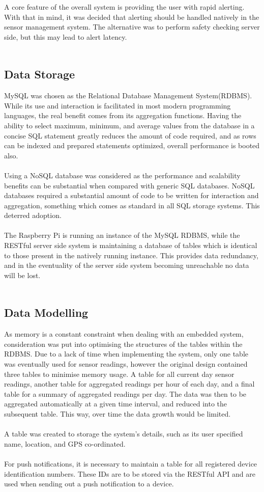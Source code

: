 \documentclass{article}
\begin{document}
A core feature of the overall system is providing the user with rapid alerting. With that in mind, it was decided that alerting should be handled natively in the sensor management system. The alternative was to perform safety checking server side, but this may lead to alert latency. \\\

\subsection{Data Storage}
MySQL was chosen as the Relational Database Management System(RDBMS). While its use and interaction is facilitated in most modern programming languages, the real benefit comes from its aggregation functions. Having the ability to select maximum, minimum, and average values from the database in a concise SQL statement greatly reduces the amount of code required, and as rows can be indexed and prepared statements optimized, overall performance is booted also. \\\\
Using a NoSQL database was considered as the performance and scalability benefits can be substantial when compared with generic SQL databases. NoSQL databases required a substantial amount of code to be written for interaction and aggregation, something which comes as standard in all SQL storage systems. This deterred adoption. \\\\
The Raspberry Pi is running an instance of the MySQL RDBMS, while the RESTful server side system is maintaining a database of tables which is identical to those present in the natively running instance. This provides data redundancy, and in the eventuality of the server side system becoming unreachable no data will be lost. \\\\
\subsection{Data Modelling}
As memory is a constant constraint when dealing with an embedded system, consideration was put into optimising the structures of the tables within the RDBMS. Due to a lack of time when implementing the system, only one table was eventually used for sensor readings, however the original design contained three tables to minimise memory usage. A table for all current day sensor readings, another table for aggregated readings per hour of each day, and a final table for a summary of aggregated readings per day. The data was then to be aggregated automatically at a given time interval, and reduced into the subsequent table. This way, over time the data growth would be limited. \\\\
A table was created to storage the system’s details, such as its user specified name, location, and GPS co-ordinated. \\\\
For push notifications, it is necessary to maintain a table for all registered device identification numbers. These IDs are to be stored via the RESTful API and are used when sending out a push notification to a device. \\\
\end{document}
